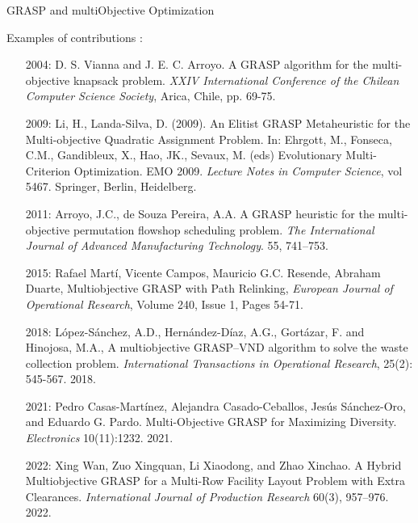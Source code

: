 \documentclass[10pt,xcolor=dvipsnames]{beamer}
\begin{document}
\begin{frame}{GRASP and multiObjective Optimization}

Examples of contributions :

{\scriptsize
\begin{itemize}
\item[2004:]
D. S. Vianna and J. E. C. Arroyo. A GRASP algorithm for the multi-objective knapsack problem.  \textit{XXIV International Conference of the Chilean Computer Science Society}, Arica, Chile, pp. 69-75.\vspace{1mm}\\

\item[2009:]
Li, H., Landa-Silva, D. (2009). An Elitist GRASP Metaheuristic for the Multi-objective Quadratic Assignment Problem. In: Ehrgott, M., Fonseca, C.M., Gandibleux, X., Hao, JK., Sevaux, M. (eds) Evolutionary Multi-Criterion Optimization. EMO 2009. \textit{Lecture Notes in Computer Science}, vol 5467. Springer, Berlin, Heidelberg. \vspace{1mm}\\

\item[2011:]
Arroyo, J.C., de Souza Pereira, A.A. A GRASP heuristic for the multi-objective permutation flowshop scheduling problem. \textit{The International Journal of Advanced Manufacturing Technology}.  55, 741–753.\vspace{1mm}\\

\item[2015:]
Rafael Martí, Vicente Campos, Mauricio G.C. Resende, Abraham Duarte,
Multiobjective GRASP with Path Relinking,
\textit{European Journal of Operational Research},
Volume 240, Issue 1, Pages 54-71.\vspace{1mm}\\

\item[2018:]
López-Sánchez, A.D., Hernández-Díaz, A.G., Gortázar, F. and Hinojosa, M.A., A multiobjective GRASP–VND algorithm to solve the waste collection problem. \textit{International Transactions in Operational Research}, 25(2): 545-567. 2018.\vspace{1mm}\\

\item[2021:]
Pedro Casas-Martínez, Alejandra Casado-Ceballos, Jesús Sánchez-Oro, and Eduardo G. Pardo. Multi-Objective GRASP for Maximizing Diversity. \textit{Electronics} 10(11):1232. 2021.\vspace{1mm}\\

\item[2022:]
Xing Wan, Zuo Xingquan, Li Xiaodong, and Zhao Xinchao. A Hybrid Multiobjective GRASP for a Multi-Row Facility Layout Problem with Extra Clearances. \textit{International Journal of Production Research} 60(3), 957–976. 2022.\\
\end{itemize}
}

\end{frame}
\end{document}
